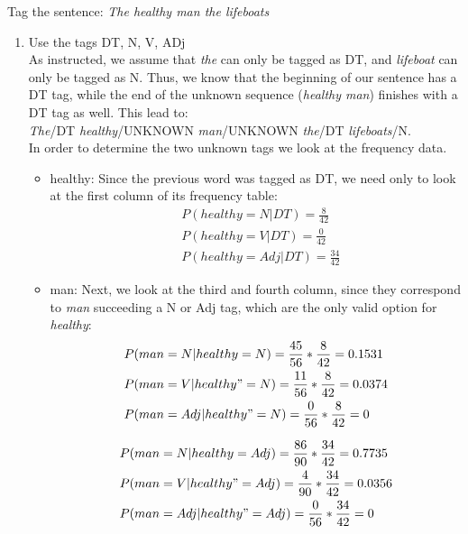 \documentclass[12pt]{article}
\newenvironment{exercise}[2][Exercise]{\begin{trivlist}
\item[\hskip \labelsep {\bfseries #1}\hskip \labelsep {\bfseries #2.}]}{\end{trivlist}}
\begin{document}
\begin{exercise}{4. Bigram tagging} Tag the sentence: \textit{The healthy man the lifeboats}
	
\begin{enumerate}[label=(\alph*)]

\item Use the tags DT, N, V, ADj\\
	As instructed, we assume that \textit{the} can only be tagged as DT, and \textit{lifeboat} can only be tagged as N. Thus, we know that the beginning of our sentence has a DT tag, while the end of the unknown sequence (\textit{healthy man}) finishes with a DT tag as well. This lead to: \\
	
	\textit{The}/DT \textit{healthy}/UNKNOWN \textit{man}/UNKNOWN \textit{the}/DT \textit{lifeboats}/N.\\
	
	In order to determine the two unknown tags we look at the frequency data. 
	
	\begin{itemize}
	\item healthy: Since the previous word was tagged as DT, we need only to look at the first column of its frequency table:
		\begin{align*}
			& P(healthy = N | DT) = \frac{8}{42} \\
			& P(healthy = V | DT) = \frac{0}{42} \\
	        & P(healthy = Adj | DT) = \frac{34}{42}
		\end{align*}
		
	\item man: Next, we look at the third and fourth column, since they correspond to \textit{man} succeeding a N or Adj tag, which are the only valid option for \textit{healthy}: 
		\begin{align*}
		& P(man = N | healthy = N) =  \frac{45}{56} * \frac{8}{42} = 0.1531 \\
        & P (man = V | healthy" = N) = \frac{11}{56} * \frac{8}{42} = 0.0374 \\
        & P (man = Adj | healthy" = N) = \frac{0}{56} * \frac{8}{42} = 0 
		\end{align*}   
		
		\begin{align*}
		& P(man = N | healthy = Adj) =  \frac{86}{90} * \frac{34}{42} = 0.7735 \\
        & P (man = V | healthy" = Adj) = \frac{4}{90} * \frac{34}{42} = 0.0356 \\
        & P (man = Adj | healthy" = Adj) = \frac{0}{56} * \frac{34}{42} = 0 
		\end{align*}


\end{itemize}
\end{enumerate}
\end{exercise}
\end{document}
